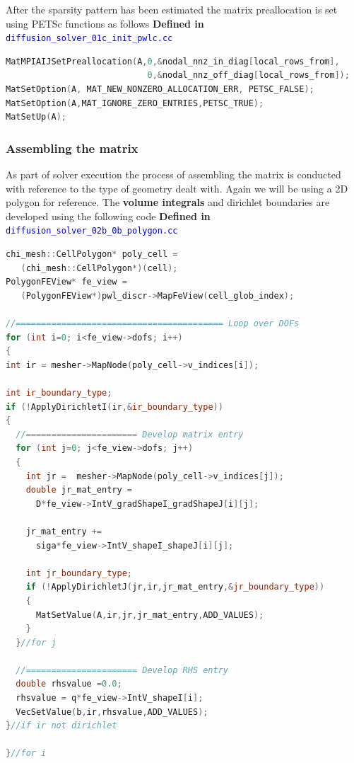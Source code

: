 \documentclass[11pt,letterpaper,titlepage]{article}
\newcommand{\xmltag}[1]{\textcolor{blue}{ \texttt{#1}} }
\numberwithin{equation}{section}
\begin{document}
After the sparsity pattern has been estimated the matrix preallocation is set using PETSc functions as follows
\newline
\newline
\textbf{Defined in }\xmltag{diffusion\_solver\_01c\_init\_pwlc.cc}
\begin{lstlisting}[language=c++]
MatMPIAIJSetPreallocation(A,0,&nodal_nnz_in_diag[local_rows_from],
                            0,&nodal_nnz_off_diag[local_rows_from]);
MatSetOption(A, MAT_NEW_NONZERO_ALLOCATION_ERR, PETSC_FALSE);
MatSetOption(A,MAT_IGNORE_ZERO_ENTRIES,PETSC_TRUE);
MatSetUp(A);
\end{lstlisting}


\subsubsection{Assembling the matrix}
As part of solver execution the process of assembling the matrix is conducted with reference to the type of geometry dealt with. Again we will be using a 2D polygon for reference. The \textbf{volume integrals} and dirichlet boundaries are developed using the following code
\newline
\newline
\textbf{Defined in }\xmltag{diffusion\_solver\_02b\_0b\_polygon.cc}
\begin{lstlisting}[language=c++]
chi_mesh::CellPolygon* poly_cell = 
   (chi_mesh::CellPolygon*)(cell);
PolygonFEView* fe_view =
   (PolygonFEView*)pwl_discr->MapFeView(cell_glob_index);

//========================================= Loop over DOFs
for (int i=0; i<fe_view->dofs; i++)
{
int ir = mesher->MapNode(poly_cell->v_indices[i]);

int ir_boundary_type;
if (!ApplyDirichletI(ir,&ir_boundary_type))
{
  //====================== Develop matrix entry
  for (int j=0; j<fe_view->dofs; j++)
  {
    int jr =  mesher->MapNode(poly_cell->v_indices[j]);
    double jr_mat_entry =
      D*fe_view->IntV_gradShapeI_gradShapeJ[i][j];

    jr_mat_entry +=
      siga*fe_view->IntV_shapeI_shapeJ[i][j];

    int jr_boundary_type;
    if (!ApplyDirichletJ(jr,ir,jr_mat_entry,&jr_boundary_type))
    {
      MatSetValue(A,ir,jr,jr_mat_entry,ADD_VALUES);
    }
  }//for j

  //====================== Develop RHS entry
  double rhsvalue =0.0;
  rhsvalue = q*fe_view->IntV_shapeI[i];
  VecSetValue(b,ir,rhsvalue,ADD_VALUES);
}//if ir not dirichlet

}//for i
\end{lstlisting}
\end{document}
